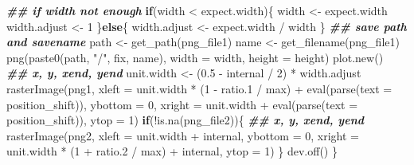 \documentclass[
]{article}
\newenvironment{Shaded}{\begin{snugshade}}{\end{snugshade}}
\newcommand{\AttributeTok}[1]{\textcolor[rgb]{0.77,0.63,0.00}{#1}}
\newcommand{\ControlFlowTok}[1]{\textcolor[rgb]{0.13,0.29,0.53}{\textbf{#1}}}
\newcommand{\DecValTok}[1]{\textcolor[rgb]{0.00,0.00,0.81}{#1}}
\newcommand{\DocumentationTok}[1]{\textcolor[rgb]{0.56,0.35,0.01}{\textbf{\textit{#1}}}}
\newcommand{\FloatTok}[1]{\textcolor[rgb]{0.00,0.00,0.81}{#1}}
\newcommand{\FunctionTok}[1]{\textcolor[rgb]{0.00,0.00,0.00}{#1}}
\newcommand{\NormalTok}[1]{#1}
\newcommand{\OtherTok}[1]{\textcolor[rgb]{0.56,0.35,0.01}{#1}}
\newcommand{\SpecialCharTok}[1]{\textcolor[rgb]{0.00,0.00,0.00}{#1}}
\newcommand{\StringTok}[1]{\textcolor[rgb]{0.31,0.60,0.02}{#1}}
\begin{document}
\begin{Shaded}
\begin{Highlighting}[]
    \DocumentationTok{\#\# if width not enough}
    \ControlFlowTok{if}\NormalTok{(width }\SpecialCharTok{\textless{}}\NormalTok{ expect.width)\{}
\NormalTok{      width }\OtherTok{\textless{}{-}}\NormalTok{ expect.width}
\NormalTok{      width.adjust }\OtherTok{\textless{}{-}} \DecValTok{1}
\NormalTok{    \}}\ControlFlowTok{else}\NormalTok{\{}
\NormalTok{      width.adjust }\OtherTok{\textless{}{-}}\NormalTok{ expect.width }\SpecialCharTok{/}\NormalTok{ width}
\NormalTok{    \}}
    \DocumentationTok{\#\# save path and savename}
\NormalTok{    path }\OtherTok{\textless{}{-}} \FunctionTok{get\_path}\NormalTok{(png\_file1)}
\NormalTok{    name }\OtherTok{\textless{}{-}} \FunctionTok{get\_filename}\NormalTok{(png\_file1)}
    \FunctionTok{png}\NormalTok{(}\FunctionTok{paste0}\NormalTok{(path, }\StringTok{"/"}\NormalTok{, fix, name), }\AttributeTok{width =}\NormalTok{ width, }\AttributeTok{height =}\NormalTok{ height)}
    \FunctionTok{plot.new}\NormalTok{()}
    \DocumentationTok{\#\# x, y, xend, yend}
\NormalTok{    unit.width }\OtherTok{\textless{}{-}}\NormalTok{ (}\FloatTok{0.5} \SpecialCharTok{{-}}\NormalTok{ internal }\SpecialCharTok{/} \DecValTok{2}\NormalTok{) }\SpecialCharTok{*}\NormalTok{ width.adjust}
    \FunctionTok{rasterImage}\NormalTok{(png1,}
                \AttributeTok{xleft =}\NormalTok{ unit.width }\SpecialCharTok{*}\NormalTok{ (}\DecValTok{1} \SpecialCharTok{{-}}\NormalTok{ ratio}\FloatTok{.1} \SpecialCharTok{/}\NormalTok{ max) }\SpecialCharTok{+}
                  \FunctionTok{eval}\NormalTok{(}\FunctionTok{parse}\NormalTok{(}\AttributeTok{text =}\NormalTok{ position\_shift)),}
                \AttributeTok{ybottom =} \DecValTok{0}\NormalTok{,}
                \AttributeTok{xright =}\NormalTok{ unit.width }\SpecialCharTok{+} 
                  \FunctionTok{eval}\NormalTok{(}\FunctionTok{parse}\NormalTok{(}\AttributeTok{text =}\NormalTok{ position\_shift)),}
                \AttributeTok{ytop =} \DecValTok{1}\NormalTok{)}
    \ControlFlowTok{if}\NormalTok{(}\SpecialCharTok{!}\FunctionTok{is.na}\NormalTok{(png\_file2))\{}
      \DocumentationTok{\#\# x, y, xend, yend}
      \FunctionTok{rasterImage}\NormalTok{(png2,}
                  \AttributeTok{xleft =}\NormalTok{ unit.width }\SpecialCharTok{+}\NormalTok{ internal,}
                  \AttributeTok{ybottom =} \DecValTok{0}\NormalTok{,}
                  \AttributeTok{xright =}\NormalTok{ unit.width }\SpecialCharTok{*}\NormalTok{ (}\DecValTok{1} \SpecialCharTok{+}\NormalTok{ ratio}\FloatTok{.2} \SpecialCharTok{/}\NormalTok{ max) }\SpecialCharTok{+}\NormalTok{ internal, }
                  \AttributeTok{ytop =} \DecValTok{1}\NormalTok{)}
\NormalTok{    \}}
    \FunctionTok{dev.off}\NormalTok{()}
\NormalTok{  \}}


\end{Highlighting}
\end{Shaded}
\end{document}
